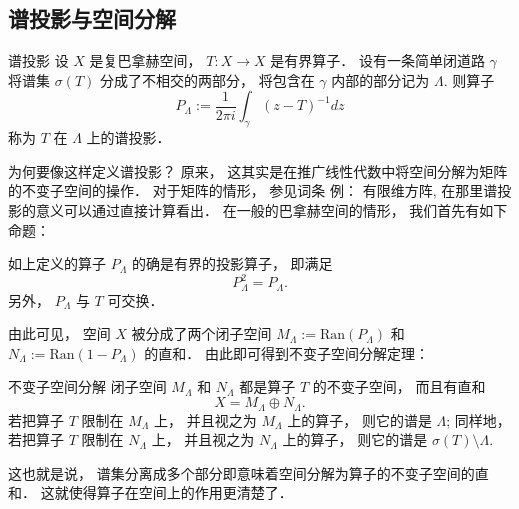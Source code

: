 

\subsection{谱投影与空间分解}
\begin{definition}{谱投影}
设 $X$ 是复巴拿赫空间， $T:X\to X$ 是有界算子． 设有一条简单闭道路 $\gamma$ 将谱集 $\sigma(T)$ 分成了不相交的两部分， 将包含在 $\gamma$ 内部的部分记为 $\Lambda$. 则算子
$$
P_\Lambda:=\frac{1}{2\pi i}\int_\gamma(z-T)^{-1}dz
$$
称为 $T$ 在 $\Lambda$ 上的谱投影．
\end{definition}

为何要像这样定义谱投影？ 原来， 这其实是在推广线性代数中将空间分解为矩阵的不变子空间的操作． 对于矩阵的情形， 参见词条 例： 有限维方阵, 在那里谱投影的意义可以通过直接计算看出． 在一般的巴拿赫空间的情形， 我们首先有如下命题：

\begin{lemma}{}
如上定义的算子 $P_\Lambda$ 的确是有界的投影算子， 即满足
$$
P_\Lambda^2=P_\Lambda.
$$
另外， $P_\Lambda$ 与 $T$ 可交换．
\end{lemma}

由此可见， 空间 $X$ 被分成了两个闭子空间 $M_\Lambda:=\text{Ran}(P_\Lambda)$ 和 $N_\Lambda:=\text{Ran}(1-P_\Lambda)$ 的直和． 由此即可得到不变子空间分解定理：

\begin{theorem}{不变子空间分解}
闭子空间 $M_\Lambda$ 和 $N_\Lambda$ 都是算子 $T$ 的不变子空间， 而且有直和
$$
X=M_\Lambda\oplus N_\Lambda.
$$
若把算子 $T$ 限制在 $M_\Lambda$ 上， 并且视之为 $M_\Lambda$ 上的算子， 则它的谱是 $\Lambda$; 同样地， 若把算子 $T$ 限制在 $N_\Lambda$ 上， 并且视之为 $N_\Lambda$ 上的算子， 则它的谱是 $\sigma(T)\setminus\Lambda$.
\end{theorem}

这也就是说， 谱集分离成多个部分即意味着空间分解为算子的不变子空间的直和． 这就使得算子在空间上的作用更清楚了．

